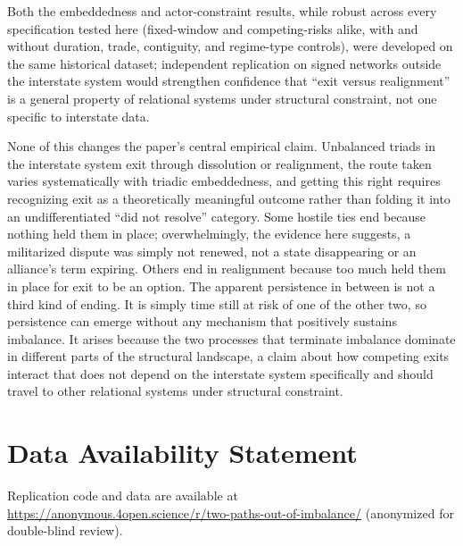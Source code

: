 \documentclass[Afour,sageh,times,doublespace]{sagej}
\begin{document}
Both the embeddedness and actor-constraint results, while robust across every specification tested here (fixed-window and competing-risks alike, with and without duration, trade, contiguity, and regime-type controls), were developed on the same historical dataset; independent replication on signed networks outside the interstate system would strengthen confidence that ``exit versus realignment'' is a general property of relational systems under structural constraint, not one specific to interstate data.

None of this changes the paper's central empirical claim. Unbalanced triads in the interstate system exit through dissolution or realignment, the route taken varies systematically with triadic embeddedness, and getting this right requires recognizing exit as a theoretically meaningful outcome rather than folding it into an undifferentiated ``did not resolve'' category. Some hostile ties end because nothing held them in place; overwhelmingly, the evidence here suggests, a militarized dispute was simply not renewed, not a state disappearing or an alliance's term expiring. Others end in realignment because too much held them in place for exit to be an option. The apparent persistence in between is not a third kind of ending. It is simply time still at risk of one of the other two, so persistence can emerge without any mechanism that positively sustains imbalance. It arises because the two processes that terminate imbalance dominate in different parts of the structural landscape, a claim about how competing exits interact that does not depend on the interstate system specifically and should travel to other relational systems under structural constraint.

\section*{Data Availability Statement}

Replication code and data are available at \url{https://anonymous.4open.science/r/two-paths-out-of-imbalance/} (anonymized for double-blind review).
\end{document}
